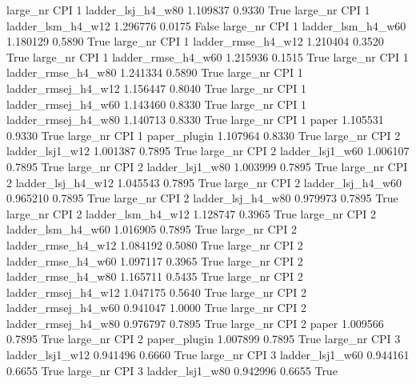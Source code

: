   large_nr      CPI                 1   ladder_lsj_h4_w80   1.109837      0.9330    True
  large_nr      CPI                 1   ladder_lsm_h4_w12   1.296776      0.0175   False
  large_nr      CPI                 1   ladder_lsm_h4_w60   1.180129      0.5890    True
  large_nr      CPI                 1  ladder_rmse_h4_w12   1.210404      0.3520    True
  large_nr      CPI                 1  ladder_rmse_h4_w60   1.215936      0.1515    True
  large_nr      CPI                 1  ladder_rmse_h4_w80   1.241334      0.5890    True
  large_nr      CPI                 1 ladder_rmsej_h4_w12   1.156447      0.8040    True
  large_nr      CPI                 1 ladder_rmsej_h4_w60   1.143460      0.8330    True
  large_nr      CPI                 1 ladder_rmsej_h4_w80   1.140713      0.8330    True
  large_nr      CPI                 1               paper   1.105531      0.9330    True
  large_nr      CPI                 1        paper_plugin   1.107964      0.8330    True
  large_nr      CPI                 2     ladder_lsj1_w12   1.001387      0.7895    True
  large_nr      CPI                 2     ladder_lsj1_w60   1.006107      0.7895    True
  large_nr      CPI                 2     ladder_lsj1_w80   1.003999      0.7895    True
  large_nr      CPI                 2   ladder_lsj_h4_w12   1.045543      0.7895    True
  large_nr      CPI                 2   ladder_lsj_h4_w60   0.965210      0.7895    True
  large_nr      CPI                 2   ladder_lsj_h4_w80   0.979973      0.7895    True
  large_nr      CPI                 2   ladder_lsm_h4_w12   1.128747      0.3965    True
  large_nr      CPI                 2   ladder_lsm_h4_w60   1.016905      0.7895    True
  large_nr      CPI                 2  ladder_rmse_h4_w12   1.084192      0.5080    True
  large_nr      CPI                 2  ladder_rmse_h4_w60   1.097117      0.3965    True
  large_nr      CPI                 2  ladder_rmse_h4_w80   1.165711      0.5435    True
  large_nr      CPI                 2 ladder_rmsej_h4_w12   1.047175      0.5640    True
  large_nr      CPI                 2 ladder_rmsej_h4_w60   0.941047      1.0000    True
  large_nr      CPI                 2 ladder_rmsej_h4_w80   0.976797      0.7895    True
  large_nr      CPI                 2               paper   1.009566      0.7895    True
  large_nr      CPI                 2        paper_plugin   1.007899      0.7895    True
  large_nr      CPI                 3     ladder_lsj1_w12   0.941496      0.6660    True
  large_nr      CPI                 3     ladder_lsj1_w60   0.944161      0.6655    True
  large_nr      CPI                 3     ladder_lsj1_w80   0.942996      0.6655    True
